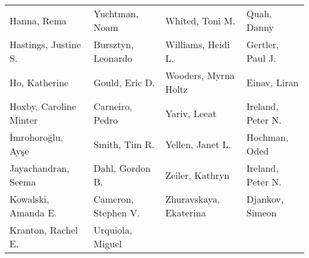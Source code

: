 \begin{ThreePartTable}
{\begin{longtable}[c]{llll}
            Hanna, Rema&Yuchtman, Noam&Whited, Toni M.&Quah, Danny\\
            Hastings, Justine S.&Bursztyn, Leonardo&Williams, Heidi L.&Gertler, Paul J.\\
            Ho, Katherine&Gould, Eric D.&Wooders, Myrna Holtz&Einav, Liran\\
            Hoxby, Caroline Minter&Carneiro, Pedro&Yariv, Leeat&Ireland, Peter N.\\
            İmrohoroğlu, Ayşe&Smith, Tim R.&Yellen, Janet L.&Hochman, Oded\\
            Jayachandran, Seema&Dahl, Gordon B.&Zeiler, Kathryn&Ireland, Peter N.\\
            Kowalski, Amanda E.&Cameron, Stephen V.&Zhuravskaya, Ekaterina&Djankov, Simeon\\
            Kranton, Rachel E.&Urquiola, Miguel&&\\
    \end{longtable}}
\end{ThreePartTable}
